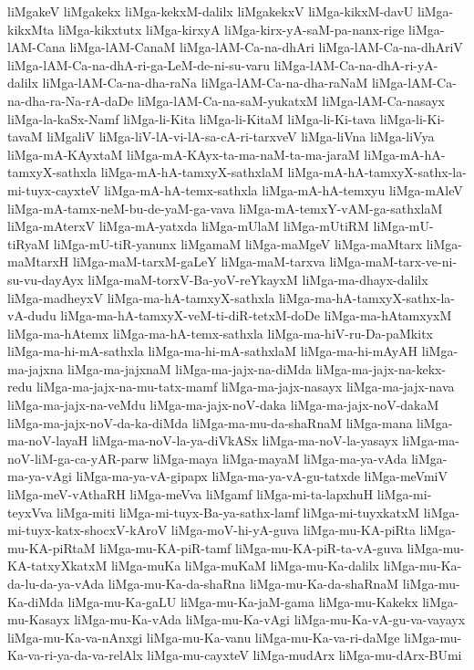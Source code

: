 {liMgakeV
liMgakekx
liMga-kekxM-dalilx
liMgakekxV
liMga-kikxM-davU
liMga-kikxMta
liMga-kikxtutx
liMga-kirxyA
liMga-kirx-yA-saM-pa-nanx-rige
liMga-lAM-Cana
liMga-lAM-CanaM
liMga-lAM-Ca-na-dhAri
liMga-lAM-Ca-na-dhAriV
liMga-lAM-Ca-na-dhA-ri-ga-LeM-de-ni-su-varu
liMga-lAM-Ca-na-dhA-ri-yA-dalilx
liMga-lAM-Ca-na-dha-raNa
liMga-lAM-Ca-na-dha-raNaM
liMga-lAM-Ca-na-dha-ra-Na-rA-daDe
liMga-lAM-Ca-na-saM-yukatxM
liMga-lAM-Ca-nasayx
liMga-la-kaSx-Namf
liMga-li-Kita
liMga-li-KitaM
liMga-li-Ki-tava
liMga-li-Ki-tavaM
liMgaliV
liMga-liV-lA-vi-lA-sa-cA-ri-tarxveV
liMga-liVna
liMga-liVya
liMga-mA-KAyxtaM
liMga-mA-KAyx-ta-ma-naM-ta-ma-jaraM
liMga-mA-hA-tamxyX-sathxla
liMga-mA-hA-tamxyX-sathxlaM
liMga-mA-hA-tamxyX-sathx-la-mi-tuyx-cayxteV
liMga-mA-hA-temx-sathxla
liMga-mA-hA-temxyu
liMga-mAleV
liMga-mA-tamx-neM-bu-de-yaM-ga-vava
liMga-mA-temxY-vAM-ga-sathxlaM
liMga-mAterxV
liMga-mA-yatxda
liMga-mUlaM
liMga-mUtiRM
liMga-mU-tiRyaM
liMga-mU-tiR-yanunx
liMgamaM
liMga-maMgeV
liMga-maMtarx
liMga-maMtarxH
liMga-maM-tarxM-gaLeY
liMga-maM-tarxva
liMga-maM-tarx-ve-ni-su-vu-dayAyx
liMga-maM-torxV-Ba-yoV-reYkayxM
liMga-ma-dhayx-dalilx
liMga-madheyxV
liMga-ma-hA-tamxyX-sathxla
liMga-ma-hA-tamxyX-sathx-la-vA-dudu
liMga-ma-hA-tamxyX-veM-ti-diR-tetxM-doDe
liMga-ma-hAtamxyxM
liMga-ma-hAtemx
liMga-ma-hA-temx-sathxla
liMga-ma-hiV-ru-Da-paMkitx
liMga-ma-hi-mA-sathxla
liMga-ma-hi-mA-sathxlaM
liMga-ma-hi-mAyAH
liMga-ma-jajxna
liMga-ma-jajxnaM
liMga-ma-jajx-na-diMda
liMga-ma-jajx-na-kekx-redu
liMga-ma-jajx-na-mu-tatx-mamf
liMga-ma-jajx-nasayx
liMga-ma-jajx-nava
liMga-ma-jajx-na-veMdu
liMga-ma-jajx-noV-daka
liMga-ma-jajx-noV-dakaM
liMga-ma-jajx-noV-da-ka-diMda
liMga-ma-mu-da-shaRnaM
liMga-mana
liMga-ma-noV-layaH
liMga-ma-noV-la-ya-diVkASx
liMga-ma-noV-la-yasayx
liMga-ma-noV-liM-ga-ca-yAR-parw
liMga-maya
liMga-mayaM
liMga-ma-ya-vAda
liMga-ma-ya-vAgi
liMga-ma-ya-vA-gipapx
liMga-ma-ya-vA-gu-tatxde
liMga-meVmiV
liMga-meV-vAthaRH
liMga-meVva
liMgamf
liMga-mi-ta-lapxhuH
liMga-mi-teyxVva
liMga-miti
liMga-mi-tuyx-Ba-ya-sathx-lamf
liMga-mi-tuyxkatxM
liMga-mi-tuyx-katx-shocxV-kAroV
liMga-moV-hi-yA-guva
liMga-mu-KA-piRta
liMga-mu-KA-piRtaM
liMga-mu-KA-piR-tamf
liMga-mu-KA-piR-ta-vA-guva
liMga-mu-KA-tatxyXkatxM
liMga-muKa
liMga-muKaM
liMga-mu-Ka-dalilx
liMga-mu-Ka-da-lu-da-ya-vAda
liMga-mu-Ka-da-shaRna
liMga-mu-Ka-da-shaRnaM
liMga-mu-Ka-diMda
liMga-mu-Ka-gaLU
liMga-mu-Ka-jaM-gama
liMga-mu-Kakekx
liMga-mu-Kasayx
liMga-mu-Ka-vAda
liMga-mu-Ka-vAgi
liMga-mu-Ka-vA-gu-va-vayayx
liMga-mu-Ka-va-nAnxgi
liMga-mu-Ka-vanu
liMga-mu-Ka-va-ri-daMge
liMga-mu-Ka-va-ri-ya-da-va-relAlx
liMga-mu-cayxteV
liMga-mudArx
liMga-mu-dArx-BUmi
}
